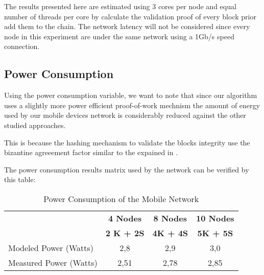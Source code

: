 \documentclass[journal]{IEEEtran}
\begin{document}
The results presented here are estimated using 3 cores per node and equal number of threads per core by calculate the validation proof of every block prior add them to the chain. The network latency will not be considered since every node in this experiment are under the same network using a 1Gb/s speed connection.


\subsection{Power Consumption}
Using the power consumption variable, we want to note that since our algorithm uses a slightly more power efficient proof-of-work mechnism the amount of energy used by our mobile devices network is considerably reduced against the other studied approaches.

This is because the hashing mechanism to validate the blocks integrity use the bizantine agreeement factor similar to the expained in \cite{giladhemomicalivlachoszeldovich2017}.

The power consumption results matrix used by the network can be verified by this table:


\begin{table}[h!] 
\begin{center} 
\begin{tabular}{|l|c|c|c|}
\hline 

\textbf{} & \textbf{4 Nodes} & \textbf{8 Nodes}  & \textbf{10 Nodes}  \\ 
\textbf{}& \textbf{2 K + 2S} & \textbf{4K + 4S} & \textbf{5K + 5S} \\
\hline 
Modeled Power (Watts)& 2,8 & 2,9 & 3,0\\ 
\hline 
Measured Power (Watts) & 2,51 & 2,78 & 2,85\\ 
\hline
\end{tabular} 
\end{center} 
\caption{Power Consumption of the Mobile Network} 
\end{table}
\end{document}
